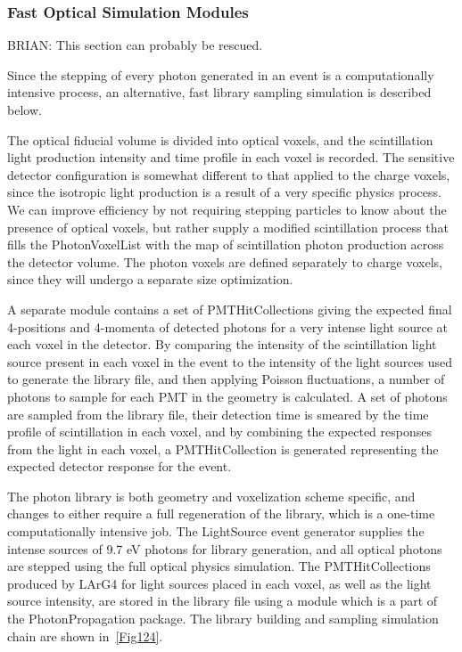 \documentclass[12pt]{elsarticle}
\begin{document}
\subsubsection{Fast Optical Simulation Modules}

BRIAN: This section can probably be rescued.

Since the stepping of every photon generated in an event is a computationally intensive process, an alternative, fast library sampling simulation is described below.

The optical fiducial volume is divided into optical voxels, and the scintillation light production intensity and time profile in each voxel is recorded.  The sensitive detector configuration is somewhat different to that applied to the charge voxels, since the isotropic light production is a result of a very specific physics process. We can improve efficiency by not requiring stepping particles to know about the presence of optical voxels, but rather supply a modified scintillation process that fills the PhotonVoxelList with the map of scintillation photon production across the detector volume.  The photon voxels are defined separately to charge voxels, since they will undergo a separate size optimization.

A separate module contains a set of PMTHitCollections
 giving the expected final 4-positions and 4-momenta of detected photons for a very intense light source at each voxel in the detector.  By comparing the intensity of the scintillation light source present in each voxel in the event to the intensity of the light sources used to generate the library file, and then applying Poisson fluctuations, a number of photons to sample for each PMT in the geometry is calculated.  A set of photons are sampled from the library file, their detection time is smeared by the time profile of scintillation in each voxel, and by combining the expected responses from the light in each voxel, a PMTHitCollection is generated representing the expected detector response for the event.

The photon library is both geometry and voxelization scheme specific, and changes to either require a full regeneration of the library, which is a one-time computationally intensive job.  The LightSource event generator supplies the intense sources of 9.7 eV photons for library generation, and all optical photons are stepped using the full optical physics simulation. The PMTHitCollections produced by LArG4 for light sources placed in each voxel, as well as the light source intensity, are stored in the library file using a module which is a part of the PhotonPropagation package.  The library building and sampling simulation chain are shown in~\ref{Fig124}.
\hspace{5cm}                         
\end{document}
